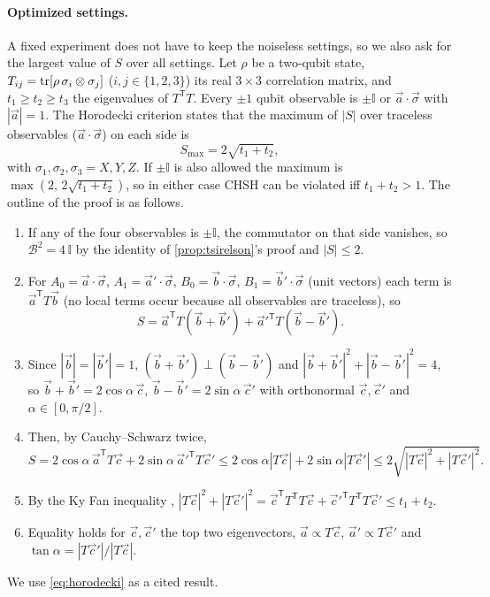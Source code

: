 \documentclass[11pt,a4paper]{article}
\begin{document}
\paragraph{Optimized settings.} A fixed experiment does not have to keep the noiseless settings, so we also ask for the largest value of $S$ over all settings. Let $\rho$ be a two-qubit state, $T_{ij}=\tr[\rho\,\sigma_i\otimes\sigma_j]$ ($i,j\in\{1,2,3\}$) its real $3\times3$ correlation matrix, and $t_1\ge t_2\ge t_3$ the eigenvalues of $T^{\mathsf T}T$. Every $\pm1$ qubit observable is $\pm\mathbb I$ or $\vec a\cdot\vec\sigma$ with $|\vec a|=1$. The Horodecki criterion \cite{horodecki} states that the maximum of $|S|$ over traceless observables ($\vec a\cdot\vec\sigma$) on each side is
\begin{equation}
S_{\max}=2\sqrt{t_1+t_2},\label{eq:horodecki}
\end{equation}
with $\sigma_1,\sigma_2,\sigma_3=X,Y,Z$. If $\pm\mathbb I$ is also allowed the maximum is $\max(2,\,2\sqrt{t_1+t_2})$, so in either case CHSH can be violated iff $t_1+t_2>1$. The outline of the proof is as follows.
\begin{enumerate}
\item If any of the four observables is $\pm\mathbb I$, the commutator on that side vanishes, so $\mathcal B^2=4\,\mathbb I$ by the identity of \cref{prop:tsirelson}'s proof and $|S|\le2$.
\item For $A_0=\vec a\cdot\vec\sigma$, $A_1=\vec a'\cdot\vec\sigma$, $B_0=\vec b\cdot\vec\sigma$, $B_1=\vec b'\cdot\vec\sigma$ (unit vectors) each term is $\vec a^{\mathsf T}T\vec b$ (no local terms occur because all observables are traceless), so
\[
S=\vec a^{\mathsf T}T(\vec b+\vec b')+\vec a'^{\mathsf T}T(\vec b-\vec b').
\]
\item Since $|\vec b|=|\vec b'|=1$, $(\vec b+\vec b')\perp(\vec b-\vec b')$ and $|\vec b+\vec b'|^2+|\vec b-\vec b'|^2=4$, so $\vec b+\vec b'=2\cos\alpha\,\vec c$, $\vec b-\vec b'=2\sin\alpha\,\vec c'$ with orthonormal $\vec c,\vec c'$ and $\alpha\in[0,\pi/2]$.
\item Then, by Cauchy--Schwarz twice,
\[
S=2\cos\alpha\,\vec a^{\mathsf T}T\vec c+2\sin\alpha\,\vec a'^{\mathsf T}T\vec c'\le2\cos\alpha|T\vec c|+2\sin\alpha|T\vec c'|\le2\sqrt{|T\vec c|^2+|T\vec c'|^2}.
\]
\item By the Ky Fan inequality \cite{kyfan}, $|T\vec c|^2+|T\vec c'|^2=\vec c^{\mathsf T}T^{\mathsf T}T\vec c+\vec c'^{\mathsf T}T^{\mathsf T}T\vec c'\le t_1+t_2$.
\item Equality holds for $\vec c,\vec c'$ the top two eigenvectors, $\vec a\propto T\vec c$, $\vec a'\propto T\vec c'$ and $\tan\alpha=|T\vec c'|/|T\vec c|$.
\end{enumerate}
We use \cref{eq:horodecki} as a cited result.
\end{document}
